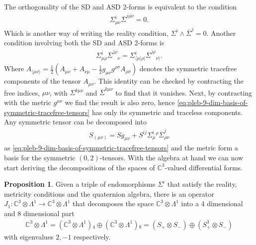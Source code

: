 \documentclass[10pt]{report}
\theoremstyle{definition}
\newtheorem{proposition}{Proposition}[chapter]
\newcommand{\C}[0]{\mathbb{C}}
\newcommand{\E}[0]{\C^3}
\newcommand{\asd}[0]{\overline{\Sigma}}
\begin{document}
The orthogonality of the SD and ASD 2-forms is equivalent to the condition
\begin{align}
    \Sigma^i_{\mu\nu} \asd^{j\mu\nu} = 0. \label{eq:pleb-reality-condition-in-components}
\end{align}
Which is another way of writing the reality condition, $\Sigma^i \wedge \asd^j = 0$. Another condition involving both the SD and ASD 2-forms is
\begin{align}
    \Sigma^i_{\mu\rho} \asd^{j\rho}{}_{\nu} = \Sigma^i_{\langle \mu|\rho|} \asd^{j\rho}{}_{\nu\rangle }. \label{eq:pleb-9-dim-basis-of-symmetric-tracefree-tensors}
\end{align}
Where $A_{\langle \mu\nu\rangle } = \frac{1}{2}(A_{\mu\nu} + A_{\nu\mu} - \frac{1}{2} g_{\mu\nu} g^{\rho\sigma} A_{\rho\sigma})$ denotes the symmetric tracefree components of the tensor $A_{\mu\nu}$. This identity can be checked by contracting the free indices, $\mu\nu$, with $\Sigma^{k\mu\nu}$ and $\asd^{k\mu\nu}$ to find that it vanishes. Next, by contracting with the metric $g^{\mu\nu}$ we find the result is also zero, hence \cref{eq:pleb-9-dim-basis-of-symmetric-tracefree-tensors} has only its symmetric and traceless components. Any symmetric tensor can be decomposed into 
\begin{align}
    S_{(\mu\nu)} = S g_{\mu\nu} + S^{ij} \Sigma^i_\mu{}^\rho \asd^j_{\rho\nu}
\end{align} 
as \cref{eq:pleb-9-dim-basis-of-symmetric-tracefree-tensors} and the metric form a basis for the symmetric $(0,2)$-tensors. With the algebra at hand we can now start deriving the decompositions of the spaces of $\E$-valued differential forms.
\begin{proposition}
    Given a triple of endomorphisms $\Sigma^i$ that satisfy the reality, metricity conditions and the quaternion algebra, there is an operator $J_1 : \E \otimes \Lambda^1 \rightarrow \E \otimes \Lambda^1$
    that decomposes the space $\E \otimes \Lambda^1$ into a 4 dimensional and 8 dimensional part
    \begin{align}
        \E \otimes \Lambda^1 = (\E \otimes \Lambda^1){}_4 \oplus (\E \otimes \Lambda^1){}_8 = (S_+ \otimes S_-) \oplus (S_+^3 \otimes S_-)
    \end{align}
    with eigenvalues $2,-1$ respectively.
\end{proposition}
\end{document}
